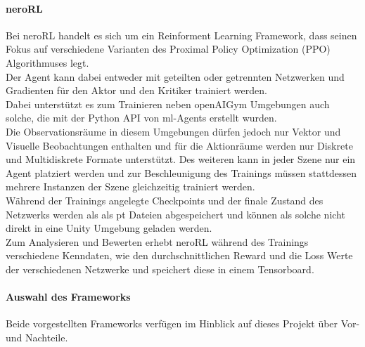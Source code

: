 \paragraph{neroRL}\fup \label{neroRLFramework}
Bei neroRL \cite{neroRL} handelt es sich um ein Reinforment Learning Framework, dass seinen Fokus auf verschiedene Varianten des Proximal Policy Optimization (PPO) Algorithmuses legt.\\
Der Agent kann dabei entweder mit geteilten oder getrennten Netzwerken und Gradienten für den Aktor und den Kritiker trainiert werden. \\
Dabei unterstützt es zum Trainieren neben openAIGym Umgebungen auch solche, die mit der Python API von ml-Agents erstellt wurden.\\
Die Observationsräume in diesem Umgebungen dürfen jedoch nur Vektor und Visuelle Beobachtungen enthalten und für die Aktionräume werden nur Diskrete und Multidiskrete Formate unterstützt.
Des weiteren kann in jeder Szene nur ein Agent platziert werden und zur Beschleunigung des Trainings müssen stattdessen mehrere Instanzen der Szene gleichzeitig trainiert werden.\\

\noindent Während der Trainings angelegte Checkpoints und der finale Zustand des Netzwerks werden als als pt Dateien abgespeichert und können als solche nicht direkt in eine Unity Umgebung geladen werden.\\
Zum Analysieren und Bewerten erhebt neroRL während des Trainings verschiedene Kenndaten, wie den durchschnittlichen Reward und die Loss Werte der verschiedenen Netzwerke und speichert diese in einem Tensorboard.

\paragraph{Auswahl des Frameworks}

Beide vorgestellten Frameworks verfügen im Hinblick auf dieses Projekt über Vor- und Nachteile.

